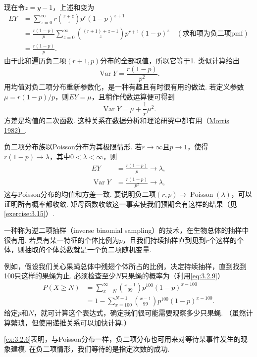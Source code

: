 现在令$z=y-1$，上述和变为
\begin{align*}
EY&=\sum_{z=0}^\infty r\binom{r+z}{z}p^r(1-p)^{z+1}\\
&=\frac{r(1-p)}p\sum_{z=0}^\infty\binom{(r+1)+z-1}{z}p^{r+1}(1-p)^z\quad(\text{求和项为负二项pmf})\\
&=\frac{r(1-p)}p.
\end{align*}
由于此和遍历负二项$(r+1,p)$分布的全部取值，所以它等于1. 类似计算给出
$$\operatorname{Var}Y=\frac{r(1-p)}{p^2}.$$
用均值对负二项分布重新参数化，是一种有趣且有时很有用的做法. 若定义参数$\mu=r(1-p)/p$，则$EY=\mu$，且稍作代数运算便可得到
$$\operatorname{Var}Y=\mu+\frac1r\mu^2.$$
方差是均值的二次函数. 这种关系在数据分析和理论研究中都有用（\hyperref[bib:source224]{Morris 1982）}.

负二项分布族以Poisson分布为其极限情形. 若$r\to\infty$且$p\to1$，使得$r(1-p)\to\lambda$，其中$0<\lambda<\infty$，则
\begin{align*}
EY&=\frac{r(1-p)}p\to\lambda,\\
\operatorname{Var}Y&=\frac{r(1-p)}{p^2}\to\lambda,
\end{align*}
这与Poisson分布的均值和方差一致. 要说明负二项$(r,p)\to\operatorname{Poisson}(\lambda)$，可以证明所有概率都收敛. 矩母函数收敛这一事实使我们预期会有这样的结果（见\autoref{exercise:3.15}）.

\begin{example}[逆二项抽样]\label{ex:3.2.6}
一种称为逆二项抽样（inverse binomial sampling）的技术，在生物总体的抽样中很有用. 若具有某一特征的个体比例为$p$，且我们持续抽样直到见到$r$个这样的个体，则抽取的个体总数就是一个负二项随机变量.

例如，假设我们关心果蝇总体中残翅个体所占的比例，决定持续抽样，直到找到100只这样的果蝇为止. 必须检查至少$N$只果蝇的概率为（利用\eqref{eq:3.2.9}）
\begin{align*}
P(X\ge N)&=\sum_{x=N}^\infty\binom{x-1}{99}p^{100}(1-p)^{x-100}\\
&=1-\sum_{x=100}^{N-1}\binom{x-1}{99}p^{100}(1-p)^{x-100}.
\end{align*}
给定$p$和$N$，就可计算这个表达式，确定我们很可能需要观察多少只果蝇. （虽然计算繁琐，但使用递推关系可以加快计算.）
\end{example}
\autoref{ex:3.2.6}表明，与Poisson分布一样，负二项分布也可用来对等待某事件发生的现象建模. 在负二项情形，我们等待的是指定次数的成功.

